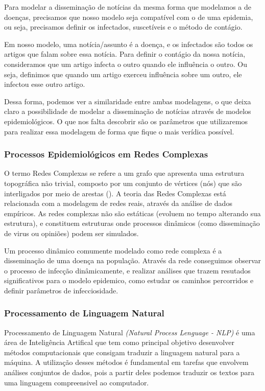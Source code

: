\documentclass[a4paper,12pt]{article}
\begin{document}
Para modelar a disseminação de notícias da mesma forma que modelamos a de doenças, precisamos
que nosso modelo seja compatível com o de uma epidemia, ou seja, precisamos definir os infectados, suscetíveis e o método de contágio.

Em nosso modelo, uma notícia/assunto é a doença, e os infectados são todos os artigos que falam sobre essa notícia. 
Para definir o contágio da nossa notícia, consideramos que um artigo infecta o outro quando ele influência o outro. Ou seja,
definimos que quando um artigo exerceu influência sobre um outro, ele infectou esse outro artigo. 

Dessa forma, podemos ver a similaridade entre ambas modelagens, o que deixa claro a possibilidade de modelar a disseminação de
notícias através de modelos epidemiológicos. O que nos falta descobrir são os parâmetros que utilizaremos para realizar essa modelagem
de forma que fique o mais verídica possível.

\subsubsection{Processos Epidemiológicos em Redes Complexas}

 O termo Redes Complexas se refere a um grafo que apresenta uma estrutura topográfica não trivial, composto por um conjunto
 de vértices (nós) que são interligados por meio de arestas (\cite{ravasz2003hierarchical}). A teoria das Redes Complexas  
 está relacionada com a modelagem de redes reais, através da 
 análise de dados empíricos. As redes complexas não são estáticas (evoluem no tempo alterando sua estrutura), e 
 constituem estruturas onde processos dinâmicos (como disseminação de virus ou opiniões) podem ser simulados.
 
 Um processo dinâmico comumente modelado como rede complexa é a disseminação de uma doença na população. Através da rede
 conseguimos observar o processo de infecção dinâmicamente, e realizar análises que trazem resutados significativos para o modelo epidemico,
 como estudar os caminhos percorridos e definir parâmetros de infecciosidade.
 
 
\subsubsection{Processamento de Linguagem Natural}
\label{sec:nlp}

Processamento de Linguagem Natural \textit{(Natural Process Lenguage - NLP)} é uma área de Inteligência Artifical que tem como principal
objetivo desenvolver métodos computacionais que consigam traduzir a linguagem natural para a máquina. A utilização desses
métodos é fundamental em tarefas que envolvem análises conjuntos de dados, pois a partir deles podemos
traduzir os textos para uma linguagem compreensivel ao computador.
\end{document}
